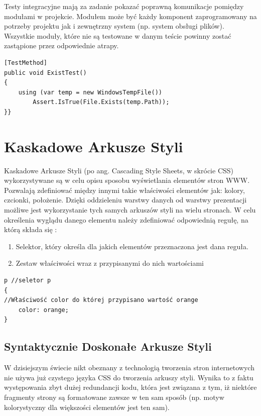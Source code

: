Testy integracyjne mają za zadanie pokazać poprawną komunikacje pomiędzy modułami w projekcie. Modułem może być każdy komponent zaprogramowany na potrzeby projektu jak i zewnętrzny system (np. system obsługi plików). Wszystkie moduły, które nie są testowane w danym teście powinny zostać zastąpione przez odpowiednie atrapy.

\begin{lstlisting}[frame=single, numbers=none,captionpos=b, 
caption={Test integracyjny wykorzystany w projekcie.}]
[TestMethod]
public void ExistTest()
{
	using (var temp = new WindowsTempFile())
		Assert.IsTrue(File.Exists(temp.Path));
}}
\end{lstlisting}

\newpage
{\let\cleardoublepage\relax \chapter{Kaskadowe Arkusze Styli}}

Kaskadowe Arkusze Styli (po ang. Cascading Style Sheets, w skrócie CSS)\cite{CSSDoc} wykorzystywane są w celu opisu sposobu wyświetlania elementów stron WWW. Pozwalają zdefiniować między innymi takie właściwości elementów jak: kolory, czcionki, położenie. Dzięki oddzieleniu warstwy danych od warstwy prezentacji możliwe jest wykorzystanie tych samych arkuszów styli na wielu stronach. 
W celu określenia wyglądu danego elementu należy zdefiniować odpowiednią regułę, na którą składa się :
\begin{enumerate}
	\item Selektor, który określa dla jakich elementów przeznaczona jest dana reguła.
	\item Zestaw właściwości wraz z przypisanymi do nich wartościami
\end{enumerate}

\begin{lstlisting}[frame=single, numbers=none,captionpos=b, 
caption={Przykład prostej reguły, dzięki której wszystkie paragrafy będą miały domyślnie kolor pomarańczowy.}]
p //seletor p
{
//Właściwość color do której przypisano wartość orange
    color: orange;
}
\end{lstlisting}

\section{Syntaktycznie Doskonałe Arkusze Styli}

W dzisiejszym świecie nikt obeznany z technologią tworzenia stron internetowych nie używa już czystego języka CSS do tworzenia arkuszy styli. 
Wynika to z faktu występowania zbyt dużej redundancji kodu, która jest związana z tym, iż niektóre fragmenty strony są formatowane zawsze w ten sam sposób (np. motyw kolorystyczny dla większości elementów jest ten sam). 

